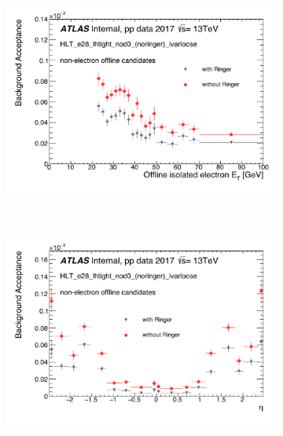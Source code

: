 \begin{figure}[h!tb]
\begin{center}
\begin{subfigure}[c]{.59\textwidth}
\centering
\includegraphics[width=\textwidth]{sections/04_operation/figures/efficiencies/eff_EGAM7_e28_ringer_and_noringer_2017_after_ts1_et.pdf}
\caption{}
\end{subfigure}\\
\begin{subfigure}[c]{.59\textwidth}
\centering
\includegraphics[width=\textwidth]{sections/04_operation/figures/efficiencies/eff_EGAM7_e28_ringer_and_noringer_2017_after_ts1_eta.pdf}
\caption{}
\end{subfigure} \\

\end{center}
\end{figure}
